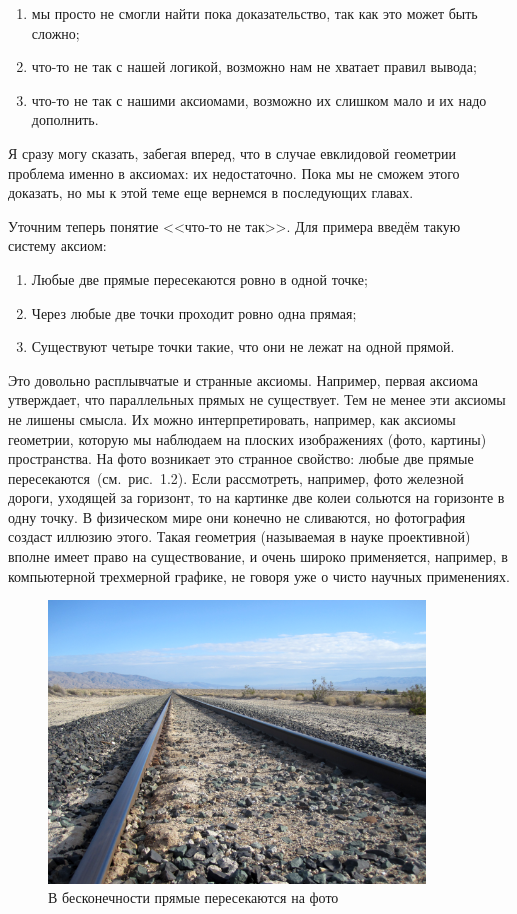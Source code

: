 \begin{enumerate}
\item мы просто не смогли найти пока доказательство, так как это может быть сложно;
\item что-то не так с нашей логикой, возможно нам не хватает правил вывода;
\item что-то не так с нашими аксиомами, возможно их слишком мало и их надо дополнить.
\end{enumerate}

Я сразу могу сказать, забегая вперед, что в случае евклидовой геометрии проблема именно в аксиомах: их недостаточно. Пока мы не сможем этого доказать, но мы к этой теме еще вернемся в последующих главах.

Уточним теперь понятие <<что-то не так>>. Для примера введём такую систему аксиом:

\begin{enumerate}
\item Любые две прямые пересекаются ровно в одной точке;
\item Через любые две точки проходит ровно одна прямая;
\item Существуют четыре точки такие, что они не лежат на одной прямой.
\end{enumerate}

Это довольно расплывчатые и странные аксиомы. Например, первая аксиома утверждает, что параллельных прямых не существует. Тем не менее эти аксиомы не лишены смысла. Их можно интерпретировать, например, как аксиомы геометрии, которую мы наблюдаем на плоских изображениях (фото, картины) пространства. На фото возникает это странное свойство: любые две прямые пересекаются~(см.~рис.~1.2). Если рассмотреть, например, фото железной дороги, уходящей за горизонт, то на картинке две колеи сольются на горизонте в одну точку. В физическом мире они конечно не сливаются, но фотография создаст иллюзию этого. Такая геометрия (называемая в науке проективной) вполне имеет право на существование, и очень широко применяется, например, в компьютерной трехмерной графике, не говоря уже о чисто научных применениях.

\begin{figure}[H]
\centering
\includegraphics[width=10cm]{images/parallels.png}
\caption{В бесконечности прямые пересекаются на фото}
\end{figure}

